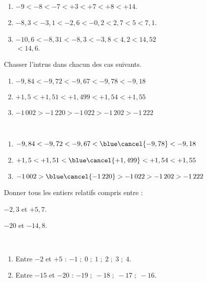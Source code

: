 \begin{colonne*exercice}
\begin{corrige}
   \ \\ [-7mm]
   {\baselineskip=7mm
   \begin{enumerate}
      \item \blue $-9<-8<-7<+3<+7<+8<+14$.
      \item \blue $-8,3<-3,1<-2,6<-0,2<2,7<5<7,1$.
      \item \blue$-10,6<-8,31<-8,3<-3,8<4,2<14,52$ \\
      \hfill $<14,6$.
   \end{enumerate}}  
\end{corrige}

\medskip


\begin{exercice} %
   Chasser l'intrus dans chacun des cas suivants.
   {\baselineskip=7mm
   \begin{enumerate}
      \item $-9,84 < -9,72 < -9,67 < -9,78 < -9,18$
      \item $+1,5 < +1,51 < +1,499 < +1,54 < +1,55$
      \item $-1\,002 > -1\,220 > -1\,022 > -1\,202 > -1\,222$
   \end{enumerate}}
\end{exercice}

\begin{corrige}
   \ \\ [-7mm]
   {\baselineskip=7mm
   \begin{enumerate}
      \item $-9,84 < -9,72 < -9,67 < {\blue\cancel{-9,78}} < -9,18$ 
      \item $+1,5 < +1,51 < {\blue\cancel{+1,499}} < +1,54 < +1,55$ 
      \item $-1\,002 > {\blue\cancel{-1\,220}} > -1\,022 > -1\,202 > -1\,222$
   \end{enumerate}}
\end{corrige}

\medskip


\begin{exercice} %
   Donner tous les entiers relatifs compris entre :
   \begin{colenumerate}{2}
      \item $-2,3$ et $+5,7$.
      \item $-20$ et $-14,8$.
   \end{colenumerate}
\end{exercice}

\begin{corrige}
   \ \\ [-5mm]
   \begin{enumerate}
      \item Entre $-2$ et $+5$ : {\blue$-1 \; ; \; 0 \; ; \; 1 \; ; \; 2 \; ; \; 3 \; ; \; 4$}. \smallskip
      \item Entre $-15$ et $-20$ : {\blue $-19 \; ; \; -18 \; ; \; -17 \; ; \; -16$}. \smallskip
   \end{enumerate}
\end{corrige}

\end{colonne*exercice}


